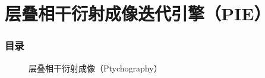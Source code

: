 \documentclass[10pt,aspectratio=169]{beamer} %
\begin{document}
\begin{frame}
    \small
\end{frame}


\section{层叠相干衍射成像迭代引擎（PIE）}

\begin{frame}
    \frametitle{目录}
    \tableofcontents[currentsection,subsectionstyle=hide]
\end{frame}

\begin{frame}
    \begin{figure}
        \begin{center}
            \quad
        \end{center}
        \caption{层叠相干衍射成像（Ptychography）}
    \end{figure}
\end{frame}
\end{document}
